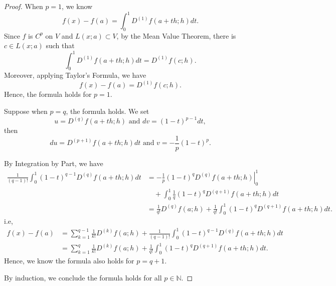 \begin{Exercise}
\begin{proof}
When $p=1$, we know
$$
f(x)-f(a) = \int_{0}^{1}D^{(1)} f(a+t h;h) d t.
$$
Since $f$ is $C^p$ on $V$ and $L(x;a) \subset V$, by the Mean Value Theorem, there is $c\in L(x;a)$ such that
$$
\int_{0}^{1}D^{(1)} f(a+t h;h) d t = D^{(1)} f(c;h).
$$
Moreover, applying Taylor's Formula, we have
$$
f(x)-f(a) = D^{(1)} f(c;h).
$$
Hence, the formula holds for $p=1$.

Suppose when $p=q$, the formula holds. We set 
$$
u=D^{(q)} f(a+t h; h) \text{ and } d v = (1-t)^{p-1}d t,
$$
then 
$$
d u=D^{(p+1)} f(a+t h; h)d t\text{ and } v=-\frac{1}{p}(1-t)^p.
$$

By Integration by Part, we have
\begin{align*}
\frac{1}{(q-1)!}\int_{0}^{1}(1-t)^{q-1}D^{(q)}f(a+t h;h)d t
&= \left. -\frac{1}{p}(1-t)^q D^{(q)} f(a+t h;h) \right|_{0}^{1} \\
&\quad + \int_{0}^{1}\frac{1}{q}(1-t)^{q} D^{(q+1)}f(a+t h;h)d t \\
&= \frac{1}{q!}D^{(q)}f(a;h) + \frac{1}{q!}\int_{0}^{1}(1-t)^{q} D^{(q+1)}f(a+t h;h)d t.
\end{align*}
i.e,
\begin{align*}
f(x)-f(a) &
= \sum_{k=1}^{q-1}\frac{1}{k!}D^{(k)}f(a;h)+\frac{1}{(q-1)!}\int_{0}^{1}(1-t)^{q-1}D^{(q)}f(a+t h;h)d t \\
&= \sum_{k=1}^{q}\frac{1}{k!}D^{(k)}f(a;h)+\frac{1}{q!}\int_{0}^{1}(1-t)^{q}D^{(q+1)}f(a+t h;h)d t.
\end{align*}
Hence, we know the formula also holds for $p=q+1$.

By induction, we conclude the formula holds for all $p\in\mathbb{N}$.
\end{proof}
\end{Exercise}